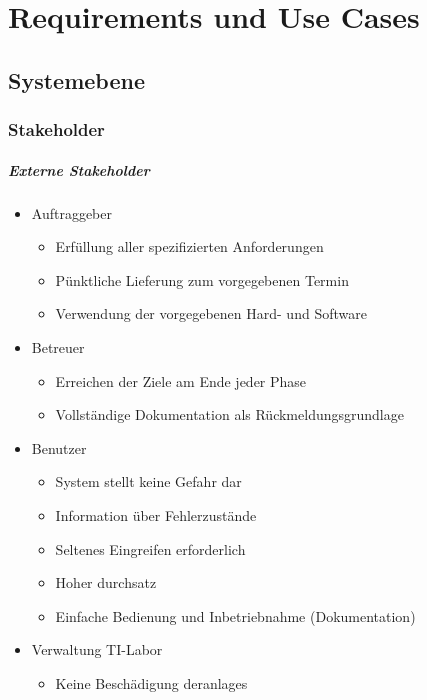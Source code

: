 \chapter{Requirements und Use Cases}\label{ch:requirements-und-use-cases}

\section{Systemebene}\label{sec:systemebene}


\subsection{Stakeholder}\label{subsec:stakeholder}


\paragraph{Externe Stakeholder}
\begin{itemize}
    \item Auftraggeber
    \begin{itemize}
        \item Erfüllung aller spezifizierten Anforderungen
        \item Pünktliche Lieferung zum vorgegebenen Termin
        \item Verwendung der vorgegebenen Hard- und Software
    \end{itemize}
    \item Betreuer
    \begin{itemize}
        \item Erreichen der Ziele am Ende jeder Phase
        \item Vollständige Dokumentation als Rückmeldungsgrundlage
    \end{itemize}
    \item Benutzer
    \begin{itemize}
        \item System stellt keine Gefahr dar
        \item Information über Fehlerzustände
        \item Seltenes Eingreifen erforderlich
        \item Hoher \gls{durchsatz}
        \item Einfache Bedienung und Inbetriebnahme (Dokumentation)
    \end{itemize}
    \item Verwaltung TI-Labor
    \begin{itemize}
        \item Keine Beschädigung der\glspl{anlage}
    \end{itemize}
\end{itemize}

